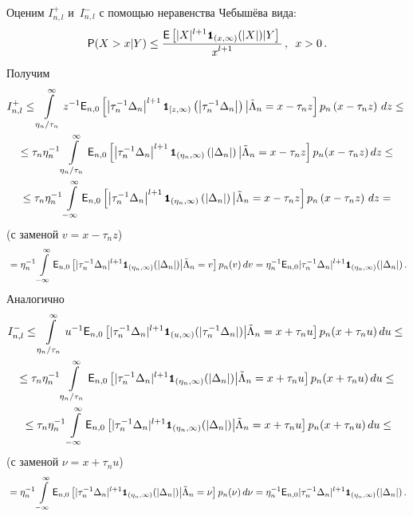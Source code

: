 Оценим $I_{n,l}^+$ и~$I_{n,l}^-$ с помощью неравенства Чебышёва вида:
$$
{{\sf P}}(X>x|Y)\leq\displaystyle\frac{\displaystyle {{\sf E}}\left[ |X|^{l+1}{\mbox{{\small \tt {1}}\hspace{-1.5mm}{\tt 1}}}_{(x,\infty)}(|X|)\vert Y \right]\mathstrut}{\displaystyle x^{l+1}\mathstrut}\,,\enskip x>0\,.
$$
Получим
\begin{multline*}
I_{n,l}^+\leq \int\limits_{\eta_n/\tau_n}^{\infty} z^{-1}
{{\sf E}}_{n,0}\left[\left| \tau_n^{-1}\Delta_n \right|^{l+1} {\mbox{{\small \tt {1}}\hspace{-1.5mm}{\tt 1}}}_{[z,\infty)}\left(\left|\tau_n^{-1}\Delta_n\right|\right)
\big| \tilde\Lambda_n=x-\tau_nz\right]p_n \left(x-\tau_nz\right)\,dz\leq{}\\
{}
\leq \tau_n\eta_n^{-1}\int\limits_{\eta_n/\tau_n}^{\infty}
{{\sf E}}_{n,0}\left[\left|\tau_n^{-1}\Delta_n\right|^{l+1} {\mbox{{\small \tt {1}}\hspace{-1.5mm}{\tt 1}}}_{(\eta_n,\infty)}\left(\left|\Delta_n\right|\right)
\big| \tilde\Lambda_n=x-\tau_nz\right]p_n(x-\tau_nz)\,dz\leq{}\\
{}\leq
\tau_n\eta_n^{-1}\int\limits_{-\infty}^{\infty}
{{\sf E}}_{n,0}\left[\left|\tau_n^{-1}\Delta_n\right|^{l+1} {\mbox{{\small \tt {1}}\hspace{-1.5mm}{\tt 1}}}_{(\eta_n,\infty)}\left(\left|\Delta_n\right|\right)
\big| \tilde\Lambda_n=x-\tau_nz\right]p_n\left(x-\tau_nz\right)\,dz={}
\end{multline*}
(с заменой $v=x-\tau_nz$)
\begin{equation*}
{}=\eta_n^{-1}\int\limits_{-\infty}^{\infty}
{{\sf E}}_{n,0}\left[|\tau_n^{-1}\Delta_n|^{l+1} {\mbox{{\small \tt {1}}\hspace{-1.5mm}{\tt 1}}}_{(\eta_n,\infty)}(|\Delta_n|)
\big| \tilde\Lambda_n=v\right]p_n(v)\,dv=
\eta_n^{-1}{{\sf E}}_{n,0}|\tau_n^{-1}\Delta_n|^{l+1} {\mbox{{\small \tt {1}}\hspace{-1.5mm}{\tt 1}}}_{(\eta_n,\infty)}(|\Delta_n|)\,.
\end{equation*}
Аналогично
\begin{multline*}
I_{n,l}^-\leq\int\limits_{\eta_n/\tau_n}^{\infty} u^{-1}
{{\sf E}}_{n,0}\left[|\tau_n^{-1}\Delta_n|^{l+1} {\mbox{{\small \tt {1}}\hspace{-1.5mm}{\tt 1}}}_{(u,\infty)}(|\tau_n^{-1}\Delta_n|)
\big| \tilde\Lambda_n=x+\tau_nu\right]p_n(x+\tau_nu)\,du\leq{}\\
{}\leq\tau_n\eta_n^{-1}\int\limits_{\eta_n/\tau_n}^{\infty}
{{\sf E}}_{n,0}\left[|\tau_n^{-1}\Delta_n|^{l+1} {\mbox{{\small \tt {1}}\hspace{-1.5mm}{\tt 1}}}_{(\eta_n,\infty)}(|\Delta_n|)
\big| \tilde\Lambda_n=x+\tau_nu\right]p_n(x+\tau_nu)\,du\leq{}
\\
{}\leq\tau_n\eta_n^{-1}\int\limits_{-\infty}^{\infty}
{{\sf E}}_{n,0}\left[|\tau_n^{-1}\Delta_n|^{l+1} {\mbox{{\small \tt {1}}\hspace{-1.5mm}{\tt 1}}}_{(\eta_n,\infty)}(|\Delta_n|)
\big| \tilde\Lambda_n=x+\tau_nu\right]p_n(x+\tau_nu)\,du\leq
\end{multline*}
(с заменой $\nu=x+\tau_nu$)
\begin{equation*}
{}=\eta_n^{-1}\int\limits_{-\infty}^{\infty}
{{\sf E}}_{n,0}\left[|\tau_n^{-1}\Delta_n|^{l+1} {\mbox{{\small \tt {1}}\hspace{-1.5mm}{\tt 1}}}_{(\eta_n,\infty)}(|\Delta_n|)
\big| \tilde\Lambda_n=\nu\right]p_n(\nu)\,d\nu=
\eta_n^{-1}{{\sf E}}_{n,0}|\tau_n^{-1}\Delta_n|^{l+1} {\mbox{{\small \tt {1}}\hspace{-1.5mm}{\tt 1}}}_{(\eta_n,\infty)}(|\Delta_n|)\,.
\end{equation*}
